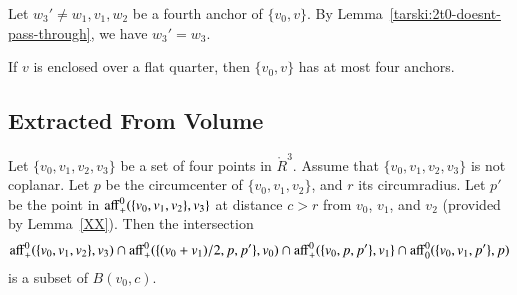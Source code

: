 \begin{tarskidata}
\begin{tarski}
\begin{proved}
Let $w_3'\ne w_1,v_1,w_2$ be a fourth anchor of $\{v_0,v\}$. By
Lemma~\ref{tarski:2t0-doesnt-pass-through}, we have $w_3'=w_3$.
\swallowed\end{proved}
\end{tarski}



\begin{tarski}

\begin{lemma}
If $v$ is enclosed over a flat quarter, then $\{v_0,v\}$ has at most four
anchors.
\end{lemma}

\begin{proved}
\swallowed\end{proved}
\end{tarski}









\begin{tarski}
\section{Extracted From Volume}
\rating{}

\begin{lemma}
Let $\{v_0,v_1,v_2,v_3\}$ be a set of four points in $\ring{R}^3$.
Assume that $\{v_0,v_1,v_2,v_3\}$ is not coplanar.  Let $p$
be the circumcenter of $\{v_0,v_1,v_2\}$, and $r$ its circumradius.  
Let $p'$ be the
point in ${\operatorname{aff}}_+^0(\{v_0,v_1,v_2\},v_3\}$ at distance
$c > r$ from $v_0$, $v_1$, and $v_2$ (provided by Lemma~\ref{XX}). %
Then the intersection
  $$
  {\operatorname{aff}}^0_+(\{v_0,v_1,v_2\},v_3) \cap
  {\operatorname{aff}}^0_+(\{(v_0+v_1)/2,p,p' \},v_0) \cap
  {\operatorname{aff}}^0_+(\{v_0,p,p'\},v_1\}\cap
  {\operatorname{aff}}^0_0(\{v_0,v_1,p'\},p)
  $$
is a subset of $B(v_0,c)$.
\end{lemma}

\begin{proved}
\swallowed\end{proved}
\end{tarski}






\end{tarskidata}
